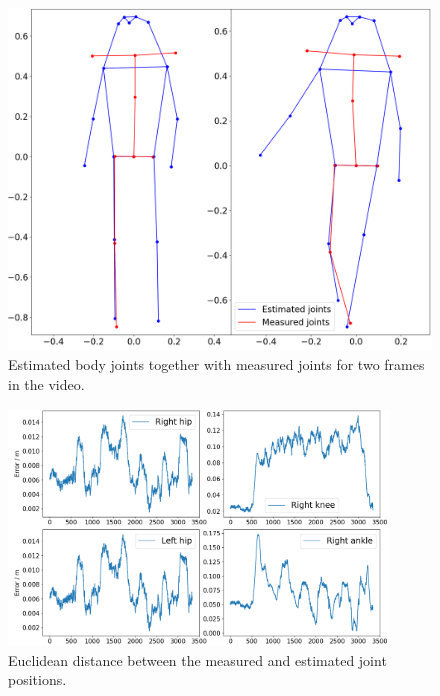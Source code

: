\documentclass{article}
\begin{document}
\begin{figure}
  \centering
  \includegraphics[height=0.8\textwidth]{figs/Figure_2.png}
  \caption{Estimated body joints together with measured joints for two frames in the video.}
  \label{fig:joints-comparison}
\end{figure}

\begin{figure}
    \centering
    \includegraphics[width=0.9\textwidth]{figs/errrors-2d}
    \caption{Euclidean distance between the measured and estimated joint positions.}
    \label{fig:errors-2d}
\end{figure}
\end{document}
